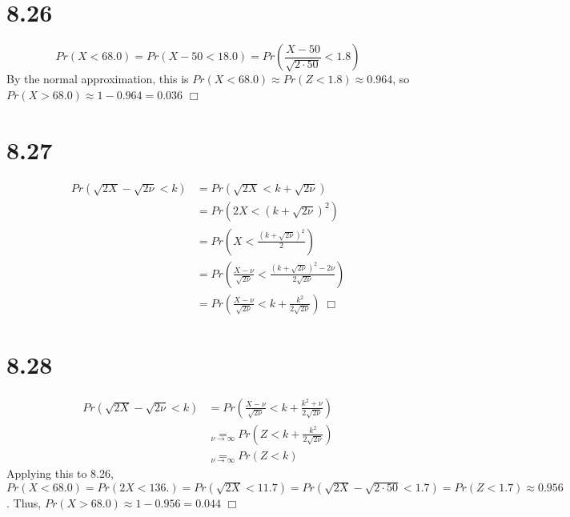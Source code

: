\documentclass{article}
\begin{document}
\section*{8.26}
\begin{equation*}
  Pr(X < 68.0) = Pr(X - 50 < 18.0) = Pr(\frac{X-50}{\sqrt{2 \cdot 50}} < 1.8)
\end{equation*}
By the normal approximation, this is $Pr(X < 68.0) \approx Pr(Z < 1.8) \approx 0.964$, so $Pr(X > 68.0) \approx 1 - 0.964 = 0.036$ $\Box$

\section*{8.27}
\begin{equation*}
\begin{split}
  Pr(\sqrt{2X} - \sqrt{2\nu} < k) &= Pr(\sqrt{2X} < k + \sqrt{2\nu})\\
  &= Pr(2X < (k + \sqrt{2\nu})^2)\\
  &= Pr\left(X < \frac{(k + \sqrt{2\nu})^2}{2}\right)\\
  &= Pr\left(\frac{X - \nu}{\sqrt{2\nu}} < \frac{(k+\sqrt{2\nu})^2 - 2\nu}{2\sqrt{2\nu}}\right)\\
  &= Pr\left(\frac{X - \nu}{\sqrt{2\nu}} < k + \frac{k^2}{2\sqrt{2\nu}} \right) \; \Box
\end{split}
\end{equation*}

\section*{8.28}
\begin{equation*}
\begin{split}
  Pr(\sqrt{2X} - \sqrt{2\nu} < k) &= Pr\left(\frac{X - \nu}{\sqrt{2\nu}} < k + \frac{k^2 + \nu}{2\sqrt{2\nu}} \right)\\
  & \underset{\nu \rightarrow \infty}{=} Pr\left(Z < k + \frac{k^2}{2\sqrt{2\nu}}\right)\\
  & \underset{\nu \rightarrow \infty}{=} Pr(Z < k)
\end{split}
\end{equation*}
Applying this to 8.26, $Pr(X < 68.0) = Pr(2X < 136.) = Pr(\sqrt{2X} < 11.7) = Pr(\sqrt{2X} - \sqrt{2\cdot 50} < 1.7) = Pr(Z < 1.7) \approx 0.956$. Thus, $Pr(X > 68.0) \approx 1 - 0.956 = 0.044$ $\Box$
\end{document}
